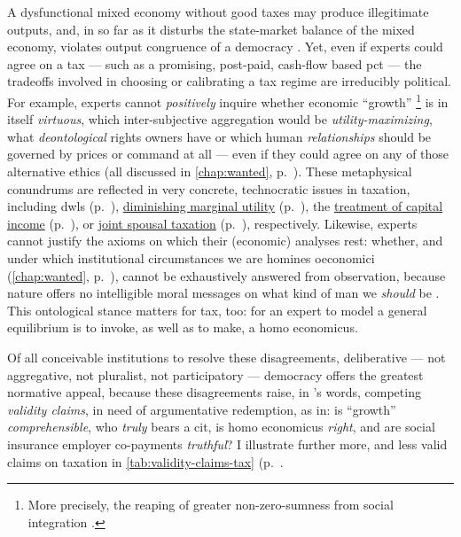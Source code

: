 A dysfunctional mixed economy without good taxes may produce illegitimate outputs, and, in so far as it disturbs the state-market balance of the mixed economy, violates output congruence of a democracy \citep[compare][190]{Zurn-2000-aa}.
Yet, even if experts could agree on a tax --- such as a promising, post-paid, cash-flow based \gls{pct} --- the tradeoffs involved in choosing or calibrating a tax regime are irreducibly political.
For example, experts cannot \emph{positively} inquire whether economic ``growth''
\footnote{
	More precisely, the reaping of greater non-zero-sumness from social integration \citep{Wright2000}.
}
is in itself \emph{virtuous}, which inter-subjective aggregation would be \emph{utility-maximizing}, what \emph{deontological} rights owners have or which human \emph{relationships} should be governed by prices or command at all --- even if they could agree on any of those alternative ethics (all discussed in \autoref{chap:wanted}, p.~\pageref{chap:wanted}).
These metaphysical conundrums are reflected in very concrete, technocratic issues in taxation, including \glspl{dwl} (p.~\pageref{sec:tax-optimality}), \hyperref[sec:diminishing-marginal-utility]{diminishing marginal utility} (p.~\pageref{sec:diminishing-marginal-utility}), the \hyperref[des:structural-agnosticism]{treatment of capital income} (p.~\pageref{des:structural-agnosticism}), or \hyperref[sec:love-marriage]{joint spousal taxation} (p.~\pageref{sec:love-marriage}), respectively.
Likewise, experts cannot justify the axioms on which their (economic) analyses rest:
whether, and under which institutional circumstances we are homines oeconomici (\autoref{chap:wanted}, p.~\pageref{chap:wanted}), cannot be exhaustively answered from observation, because nature offers no intelligible moral messages on what kind of man we \emph{should} be \citep[43]{Gould1982}.
This ontological stance matters for tax, too:
for an expert to model a general equilibrium is to invoke, as well as to make, a homo economicus.

Of all conceivable institutions to resolve these disagreements, deliberative --- not aggregative, not pluralist, not participatory --- democracy offers the greatest normative appeal, because these disagreements raise, in \citeauthor{Habermas-1984}'s words, competing \emph{validity claims}, in need of argumentative redemption, as in:
is ``growth'' \emph{comprehensible}, who \emph{truly} bears a \gls{cit}, is homo economicus \emph{right}, and are social insurance employer co-payments \emph{truthful}?
I illustrate further more, and less valid claims on taxation in \autoref{tab:validity-claims-tax} (p.~\pageref{tab:validity-claims-tax}.

